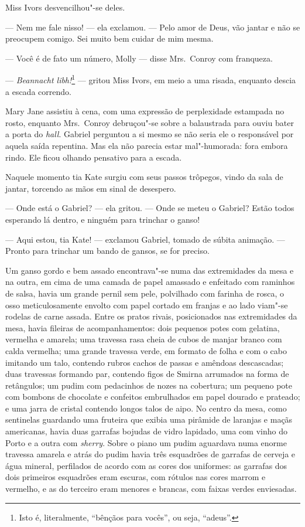 Miss Ivors desvencilhou"-se deles.

--- Nem me fale nisso! --- ela exclamou.  --- Pelo amor de Deus, vão jantar e
não se preocupem comigo.  Sei muito bem cuidar de mim mesma.

--- Você é de fato um número, Molly --- disse Mrs.~Conroy com franqueza.

--- \textit{Beannacht libh!}\footnote{ Isto é, literalmente, “bênçãos para
vocês”, ou seja, “adeus”.} --- gritou Miss Ivors, em meio a uma
risada, enquanto descia a escada correndo.

Mary Jane assistiu à cena, com uma expressão de perplexidade estampada no
rosto, enquanto Mrs.~Conroy debruçou"-se sobre a balaustrada para ouviu bater a
porta do \textit{hall}.  Gabriel perguntou a si mesmo se não seria ele o
responsável por aquela saída repentina.  Mas ela não parecia estar
mal"-humorada: fora embora rindo.  Ele ficou olhando pensativo para a escada.

Naquele momento tia Kate surgiu com seus passos trôpegos, vindo da sala de
jantar, torcendo as mãos em sinal de desespero.

--- Onde está o Gabriel? --- ela gritou.  --- Onde se meteu o Gabriel?  Estão
todos esperando lá dentro, e ninguém para trinchar o ganso!

--- Aqui estou, tia Kate! --- exclamou Gabriel, tomado de súbita animação.  ---
Pronto para trinchar um bando de gansos, se for preciso.

Um ganso gordo e bem assado encontrava"-se numa das extremidades da mesa e na
outra, em cima de uma camada de papel amassado e enfeitado com raminhos de
salsa, havia um grande pernil sem pele, polvilhado com farinha de rosca, o osso
meticulosamente envolto com papel cortado em franjas e ao lado viam"-se rodelas
de carne assada.  Entre os pratos rivais, posicionados nas extremidades da
mesa, havia fileiras de acompanhamentos: dois pequenos potes com gelatina,
vermelha e amarela; uma travessa rasa cheia de cubos de manjar branco com calda
vermelha; uma grande travessa verde, em formato de folha e com o cabo imitando
um talo, contendo rubros cachos de passas e amêndoas descascadas; duas
travessas formando par, contendo figos de Smirna arrumados na forma de
retângulos; um pudim com pedacinhos de nozes na cobertura; um pequeno pote com
bombons de chocolate e confeitos embrulhados em papel dourado e prateado; e uma
jarra de cristal contendo longos talos de aipo.  No centro da mesa, como
sentinelas guardando uma fruteira que exibia uma pirâmide de laranjas e maçãs
americanas, havia duas garrafas bojudas de vidro lapidado, uma com vinho do
Porto e a outra com \textit{sherry}.  Sobre o piano um pudim aguardava numa
enorme travessa amarela e atrás do pudim havia três esquadrões de garrafas de
cerveja e água mineral, perfilados de acordo com as cores dos uniformes: as
garrafas dos dois primeiros esquadrões eram escuras, com rótulos nas cores
marrom e vermelho, e as do terceiro eram menores e brancas, com faixas verdes
enviesadas.

